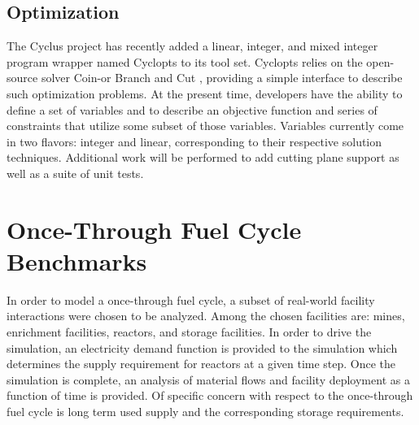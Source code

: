 \documentclass{anstrans}
\begin{document}
\subsection{Optimization}
The Cyclus project has recently added a linear, integer, and mixed integer program wrapper named Cyclopts \cite{cyclopts2012} to its tool set. Cyclopts relies on the
open-source solver Coin-or Branch and Cut \cite{coinCBC}, providing a simple interface to describe such optimization problems. At the present time,
developers have the ability to define a set of variables and to describe an objective function and series of constraints that utilize some subset
of those variables. Variables currently come in two flavors: integer and linear, corresponding to their respective solution techniques. Additional
work will be performed to add cutting plane support as well as a suite of unit tests.
\section{Once-Through Fuel Cycle Benchmarks}
In order to model a once-through fuel cycle, a subset of real-world facility interactions were chosen to be analyzed. Among the chosen facilities are:
mines, enrichment facilities, reactors, and storage facilities. In order to drive the simulation, an electricity demand function is provided to the 
simulation which determines the supply requirement for reactors at a given time step. Once the simulation is complete, an analysis of material
flows and facility deployment as a function of time is provided. Of specific concern with respect to the once-through fuel cycle is long term used
supply and the corresponding storage requirements.
\end{document}
